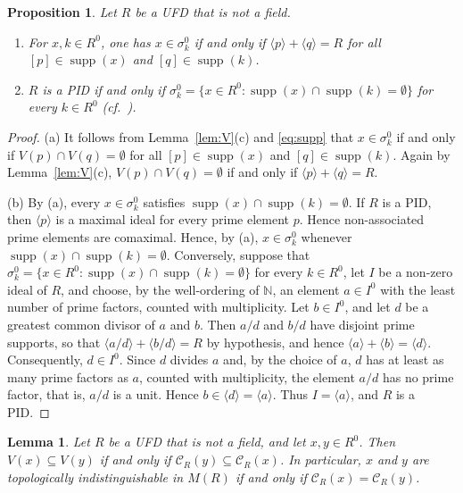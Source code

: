 \documentclass[12pt,reqno,a4paper]{amsart}
\newcommand{\N}{\mathbb{N}}
\DeclareMathOperator{\supp}{supp}
\theoremstyle{plain}
\newtheorem{proposition}[theorem]{Proposition}
\newtheorem{lemma}[theorem]{Lemma}
\theoremstyle{definition}
\begin{document}
\begin{proposition}\label{prop:ufd-comax}
Let $R$ be a UFD that is not a field.
\begin{enumerate}[label=\textup{(\alph*)}]
\item For $x,k\in R^0$, one has $x\in\sigma_k^0$ if and only if $\langle p\rangle+\langle q\rangle=R$ for all $[p]\in\supp(x)$ and $[q]\in\supp(k)$.
\item $R$ is a PID if and only if $\sigma_k^0=\{x\in R^0:\supp(x)\cap\supp(k)=\emptyset\}$ for every $k\in R^0$ \textup{(}cf.\ \cite[Corollary~3.17]{MaciasOrtiz}\textup{)}.
\end{enumerate}
\end{proposition}

\begin{proof}
(a) It follows from Lemma~\ref{lem:V}(c) and \eqref{eq:supp} that $x\in\sigma_k^0$ if and only if $V(p)\cap V(q)=\emptyset$ for all $[p]\in\supp(x)$ and $[q]\in\supp(k)$. Again by Lemma~\ref{lem:V}(c), $V(p)\cap V(q)=\emptyset$ if and only if $\langle p\rangle+\langle q\rangle=R$.

(b) By (a), every $x\in\sigma_k^0$ satisfies $\supp(x)\cap\supp(k)=\emptyset$. If $R$ is a PID, then $\langle p\rangle$ is a maximal ideal for every prime element $p$. Hence non-associated prime elements are comaximal. Hence, by (a), $x\in\sigma_k^0$ whenever $\supp(x)\cap\supp(k)=\emptyset$. Conversely, suppose that $\sigma_k^0=\{x\in R^0:\supp(x)\cap\supp(k)=\emptyset\}$ for every $k\in R^0$, let $I$ be a non-zero ideal of $R$, and choose, by the well-ordering of $\N$, an element $a\in I^0$ with the least number of prime factors, counted with multiplicity. Let $b\in I^0$, and let $d$ be a greatest common divisor of $a$ and $b$. Then $a/d$ and $b/d$ have disjoint prime supports, so that $\langle a/d\rangle+\langle b/d\rangle=R$ by hypothesis, and hence $\langle a\rangle+\langle b\rangle=\langle d\rangle$. Consequently, $d\in I^0$. Since $d$ divides $a$ and, by the choice of $a$, $d$ has at least as many prime factors as $a$, counted with multiplicity, the element $a/d$ has no prime factor, that is, $a/d$ is a unit. Hence $b\in\langle d\rangle=\langle a\rangle$. Thus $I=\langle a\rangle$, and $R$ is a PID.
\end{proof}

\begin{lemma}\label{lem:types}
Let $R$ be a UFD that is not a field, and let $x,y\in R^0$. Then $V(x)\subseteq V(y)$ if and only if $\mathcal{C}_R(y)\subseteq\mathcal{C}_R(x)$. In particular, $x$ and $y$ are topologically indistinguishable in $M(R)$ if and only if $\mathcal{C}_R(x)=\mathcal{C}_R(y)$.
\end{lemma}
\end{document}
